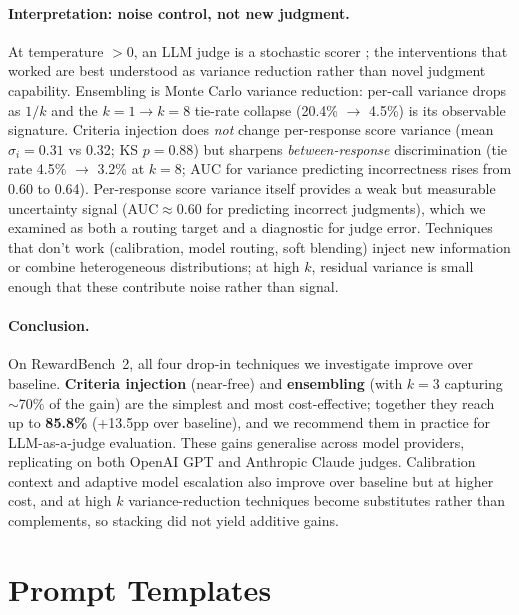 \documentclass{article}
\begin{document}
\paragraph{Interpretation: noise control, not new judgment.} At temperature $>0$, an LLM judge is a stochastic scorer \citep{stureborg2024inconsistent}; the interventions that worked are best understood as variance reduction rather than novel judgment capability. Ensembling is Monte Carlo variance reduction: per-call variance drops as $1/k$ and the $k{=}1 \to k{=}8$ tie-rate collapse (20.4\% $\to$ 4.5\%) is its observable signature. Criteria injection does \emph{not} change per-response score variance (mean $\sigma_i{=}0.31$ vs 0.32; KS $p{=}0.88$) but sharpens \emph{between-response} discrimination (tie rate 4.5\% $\to$ 3.2\% at $k{=}8$; AUC for variance predicting incorrectness rises from 0.60 to 0.64). Per-response score variance itself provides a weak but measurable uncertainty signal (AUC${\approx}$0.60 for predicting incorrect judgments), which we examined as both a routing target and a diagnostic for judge error. Techniques that don't work (calibration, model routing, soft blending) inject new information or combine heterogeneous distributions; at high $k$, residual variance is small enough that these contribute noise rather than signal.

\paragraph{Conclusion.} On RewardBench~2, all four drop-in techniques we investigate improve over baseline. \textbf{Criteria injection} (near-free) and \textbf{ensembling} (with $k{=}3$ capturing ${\sim}$70\% of the gain) are the simplest and most cost-effective; together they reach up to \textbf{85.8\%} (+13.5pp over baseline), and we recommend them in practice for LLM-as-a-judge evaluation. These gains generalise across model providers, replicating on both OpenAI GPT and Anthropic Claude judges. Calibration context and adaptive model escalation also improve over baseline but at higher cost, and at high $k$ variance-reduction techniques become substitutes rather than complements, so stacking did not yield additive gains.

\FloatBarrier
\balance



\appendix
\section{Prompt Templates}
\label{sec:prompts}
\end{document}
